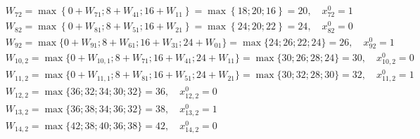 \begin{align*}
     & W_{72} = \max \left\{0 + W_{71}; 8 + W_{41}; 16 + W_{11}\right\} = \max \left\{18; 20; 16\right\} = 20, \quad x_{72}^0 = 1     \\
     & W_{82} = \max \left\{0 + W_{81}; 8 + W_{51}; 16 + W_{21}\right\} = \max \left\{24; 20; 22\right\} = 24, \quad x_{82}^0 = 0     \\
     & W_{92} = \max \{0 + W_{91}; 8 + W_{61}; 16 + W_{31}; 24 + W_01\} = \max \{24; 26; 22; 24\} = 26, \quad x_{92}^0 = 1            \\
     & W_{10, 2} = \max \{0 + W_{10, 1}; 8 + W_{71}; 16 + W_{41}; 24 + W_{11}\} = \max \{30; 26; 28; 24\} = 30, \quad x_{10, 2}^0 = 0 \\
     & W_{11, 2} = \max \{0 + W_{11, 1}; 8 + W_{81}; 16 + W_{51}; 24 + W_{21}\} = \max \{30; 32; 28; 30\} = 32, \quad x_{11, 2}^0 = 1 \\
     & W_{12, 2} = \max \{36; 32; 34; 30; 32\} = 36, \quad x_{12, 2}^0 = 0                                                            \\
     & W_{13, 2} = \max \{36; 38; 34; 36; 32\} = 38, \quad x_{13, 2}^0 = 1                                                            \\
     & W_{14, 2} = \max \{42; 38; 40; 36; 38\} = 42, \quad x_{14, 2}^0 = 0
\end{align*}


